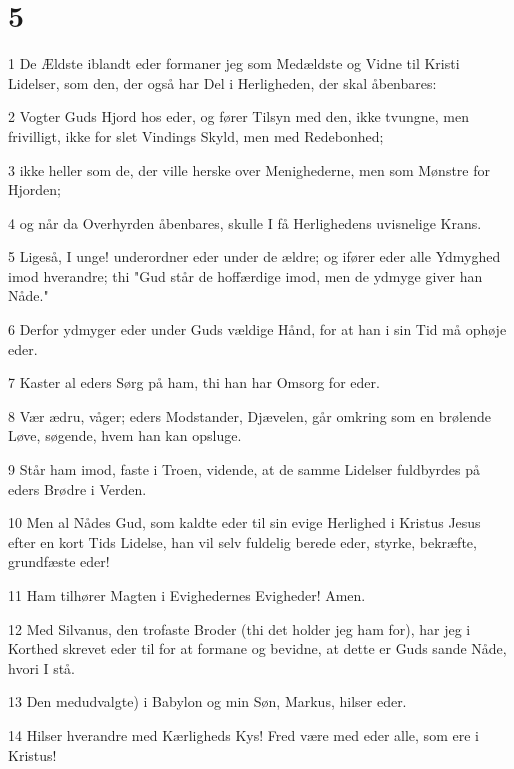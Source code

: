 \chapter{5}

\par 1 De Ældste iblandt eder formaner jeg som Medældste og Vidne til Kristi Lidelser, som den, der også har Del i Herligheden, der skal åbenbares:
\par 2 Vogter Guds Hjord hos eder, og fører Tilsyn med den, ikke tvungne, men frivilligt, ikke for slet Vindings Skyld, men med Redebonhed;
\par 3 ikke heller som de, der ville herske over Menighederne, men som Mønstre for Hjorden;
\par 4 og når da Overhyrden åbenbares, skulle I få Herlighedens uvisnelige Krans.
\par 5 Ligeså, I unge! underordner eder under de ældre; og ifører eder alle Ydmyghed imod hverandre; thi "Gud står de hoffærdige imod, men de ydmyge giver han Nåde."
\par 6 Derfor ydmyger eder under Guds vældige Hånd, for at han i sin Tid må ophøje eder.
\par 7 Kaster al eders Sørg på ham, thi han har Omsorg for eder.
\par 8 Vær ædru, våger; eders Modstander, Djævelen, går omkring som en brølende Løve, søgende, hvem han kan opsluge.
\par 9 Står ham imod, faste i Troen, vidende, at de samme Lidelser fuldbyrdes på eders Brødre i Verden.
\par 10 Men al Nådes Gud, som kaldte eder til sin evige Herlighed i Kristus Jesus efter en kort Tids Lidelse, han vil selv fuldelig berede eder, styrke, bekræfte, grundfæste eder!
\par 11 Ham tilhører Magten i Evighedernes Evigheder! Amen.
\par 12 Med Silvanus, den trofaste Broder (thi det holder jeg ham for), har jeg i Korthed skrevet eder til for at formane og bevidne, at dette er Guds sande Nåde, hvori I stå.
\par 13 Den medudvalgte) i Babylon og min Søn, Markus, hilser eder.
\par 14 Hilser hverandre med Kærligheds Kys! Fred være med eder alle, som ere i Kristus!



